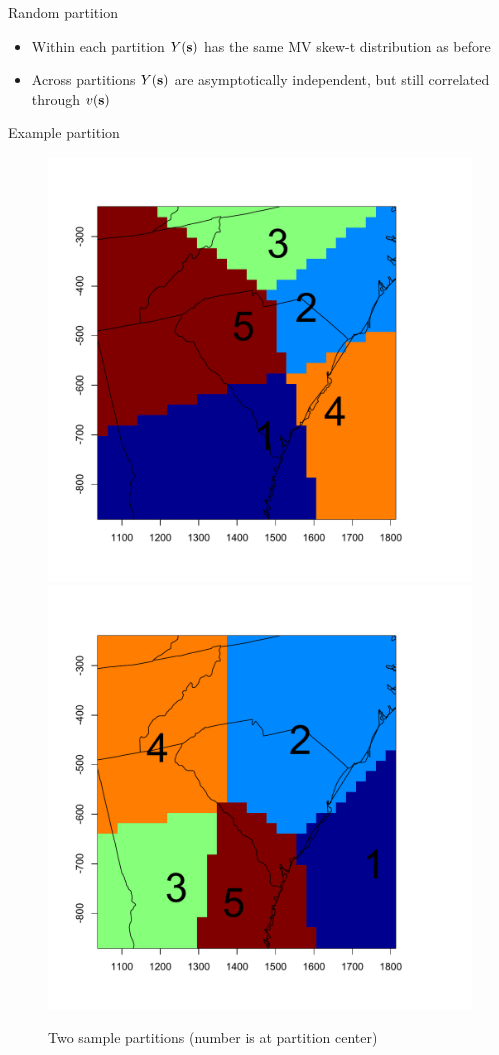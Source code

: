 \documentclass{beamer}
\begin{document}
\begin{frame}{Random partition}
  \begin{itemize} \setlength{\itemsep}{0.5em}
    \item Within each partition $Y(\mbox{\bf s})$ has the same MV skew-t distribution as before
    \item Across partitions $Y(\mbox{\bf s})$ are asymptotically independent, but still correlated through $v(\mbox{\bf s})$
  \end{itemize}
\end{frame}

\begin{frame}{Example partition}
    \centering
    \begin{figure}
    \includegraphics[width=0.54\linewidth]{./plots/pot/example-partition-1.pdf}
    \includegraphics[width=0.54\linewidth]{./plots/pot/example-partition-2.pdf}
    \caption{Two sample partitions (number is at partition center)}
    \end{figure}
\end{frame}
\end{document}
